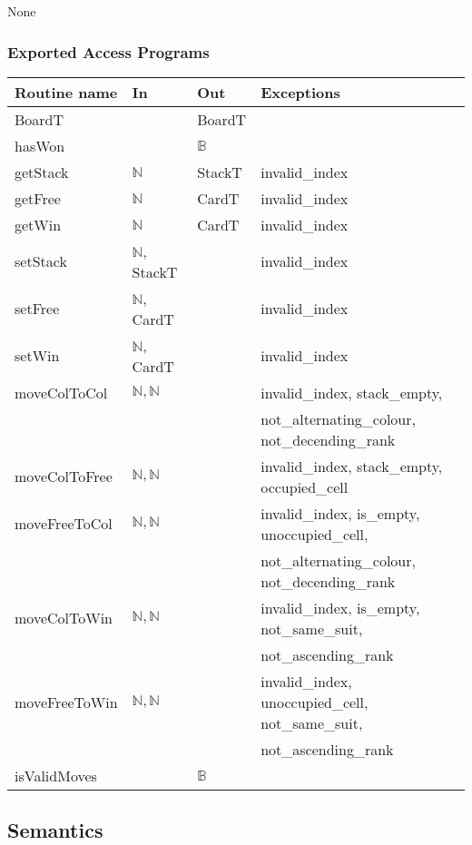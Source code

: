 \documentclass[12pt]{article}
\begin{document}
None

\subsubsection*{Exported Access Programs}

\begin{tabular}{| l | l | l | l |}
    \hline
    \textbf{Routine name} & \textbf{In} & \textbf{Out} & \textbf{Exceptions}\\
    \hline
    BoardT & ~ & BoardT & ~\\
    \hline
    hasWon & ~ & $\mathbb{B}$ & ~\\
    \hline
    getStack & $\mathbb{N}$ & StackT & invalid\_index\\
    \hline
    getFree & $\mathbb{N}$ & CardT & invalid\_index\\
    \hline
    getWin & $\mathbb{N}$ & CardT & invalid\_index\\
    \hline
    setStack & $\mathbb{N}$, StackT & ~ & invalid\_index\\
    \hline
    setFree & $\mathbb{N}$, CardT & ~ & invalid\_index\\
    \hline
    setWin & $\mathbb{N}$, CardT & ~ & invalid\_index\\
    \hline
    moveColToCol & $\mathbb{N},\mathbb{N}$ & ~ & invalid\_index, stack\_empty,\\
    & & & not\_alternating\_colour, not\_decending\_rank\\
    \hline
    moveColToFree & $\mathbb{N},\mathbb{N}$ & ~ & invalid\_index, stack\_empty, occupied\_cell\\
    \hline
    moveFreeToCol & $\mathbb{N},\mathbb{N}$ & ~ & invalid\_index, is\_empty, unoccupied\_cell, \\
    & & & not\_alternating\_colour, not\_decending\_rank\\
    \hline
    moveColToWin & $\mathbb{N},\mathbb{N}$ & ~ & invalid\_index, is\_empty, not\_same\_suit, \\
    & & &not\_ascending\_rank\\
    \hline
    moveFreeToWin & $\mathbb{N},\mathbb{N}$ & ~ & invalid\_index, unoccupied\_cell, not\_same\_suit,\\
    & & & not\_ascending\_rank\\
    \hline
    isValidMoves & ~ & $\mathbb{B}$ & ~\\
    \hline
\end{tabular}

\subsection* {Semantics}
\end{document}

